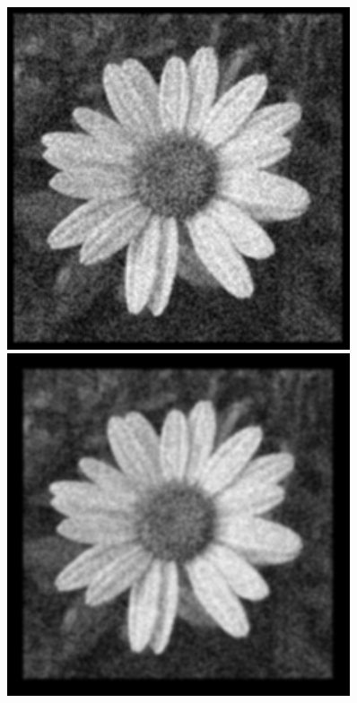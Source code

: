 \documentclass[a4paper]{report}
\begin{document}
\begin{figure}[H]
\centering
\begin{minipage}{.5\textwidth}
  \centering
    \includegraphics[width=0.9\textwidth]{images/Canny/flowerSize3.png}
\end{minipage}%
\begin{minipage}{.5\textwidth}
  \centering
  \includegraphics[width=0.9\textwidth]{images/Canny/flowerSize13.png}
\end{minipage}
\end{figure}
\end{document}
